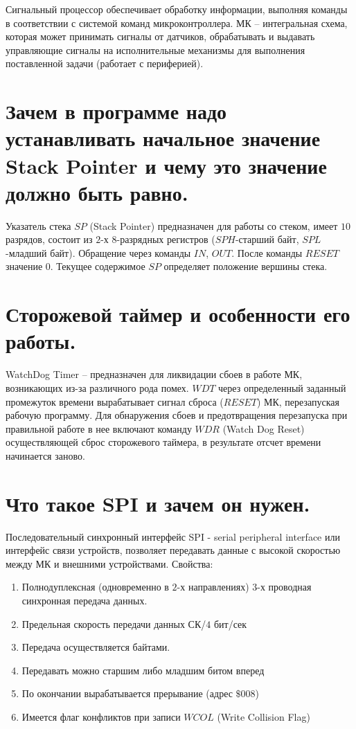 Сигнальный процессор обеспечивает обработку информации, выполняя команды в соответствии с 
системой команд микроконтроллера. 
МК – интегральная схема, которая может принимать сигналы от датчиков, обрабатывать и 
выдавать управляющие сигналы на исполнительные механизмы для выполнения поставленной задачи 
(работает с периферией).

\section{Зачем в программе надо устанавливать начальное значение Stack Pointer и чему это значение должно быть равно.}

Указатель стека $SP$ (Stack Pointer) предназначен для работы со стеком, имеет $10$ разрядов, 
состоит из $2$-х $8$-разрядных регистров ($SPH$-старший байт, $SPL$-младший байт). Обращение 
через команды $IN$, $OUT$. После команды $RESET$ значение $0$. 
Текущее содержимое $SP$ определяет положение вершины стека. 

\section{Сторожевой таймер и особенности его работы.}

WatchDog Timer – предназначен для ликвидации сбоев в работе МК, возникающих из-за различного
рода помех. $WDT$ через определенный заданный промежуток времени вырабатывает сигнал сброса 
($RESET$) МК, перезапуская рабочую программу. Для обнаружения сбоев и предотвращения 
перезапуска при правильной работе в нее включают команду $WDR$ (Watch Dog Reset) 
осуществляющей сброс сторожевого таймера, в результате отсчет времени начинается заново.

\section{Что такое SPI и зачем он нужен.}

Последовательный синхронный интерфейс SPI - serial peripheral interface или интерфейс связи
устройств, позволяет передавать данные с высокой скоростью между МК и внешними устройствами.
Свойства:
\begin{enumerate}
  \item Полнодуплексная (одновременно в $2$-х направлениях) $3$-х проводная синхронная
        передача данных. 
  \item Предельная скорость передачи данных СК/$4$ бит/сек 
  \item Передача осуществляется байтами.
  \item Передавать можно старшим либо младшим битом вперед  
  \item По окончании вырабатывается прерывание (адрес $\$008$) 
  \item Имеется флаг конфликтов при записи $WCOL$ (Write Collision Flag) 
\end{enumerate}	

